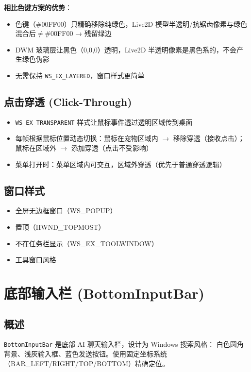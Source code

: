 \documentclass[12pt,a4paper]{ctexart}
\begin{document}
\textbf{相比色键方案的优势}：
\begin{itemize}
    \item 色键（\#00FF00）只精确移除纯绿色，Live2D 模型半透明/抗锯齿像素与绿色混合后$\neq$\#00FF00 → 残留绿边
    \item DWM 玻璃层让黑色（0,0,0）透明，Live2D 半透明像素是黑色系的，不会产生绿色伪影
    \item 无需保持 \texttt{WS\_EX\_LAYERED}，窗口样式更简单
\end{itemize}

\subsection{点击穿透 (Click-Through)}

\begin{itemize}
    \item \texttt{WS\_EX\_TRANSPARENT} 样式让鼠标事件透过透明区域传到桌面
    \item 每帧根据鼠标位置动态切换：鼠标在宠物区域内 $\to$ 移除穿透（接收点击）；
        鼠标在区域外 $\to$ 添加穿透（点击不受影响）
    \item 菜单打开时：菜单区域内可交互，区域外穿透（优先于普通穿透逻辑）
\end{itemize}

\subsection{窗口样式}

\begin{itemize}
    \item 全屏无边框窗口（WS\_POPUP）
    \item 置顶（HWND\_TOPMOST）
    \item 不在任务栏显示（WS\_EX\_TOOLWINDOW）
    \item 工具窗口风格
\end{itemize}

\section{底部输入栏 (BottomInputBar)}

\subsection{概述}

\texttt{BottomInputBar} 是底部 AI 聊天输入栏，设计为 Windows 搜索风格：
白色圆角背景、浅灰输入框、蓝色发送按钮。使用固定坐标系统
（BAR\_LEFT/RIGHT/TOP/BOTTOM）精确定位。
\end{document}
